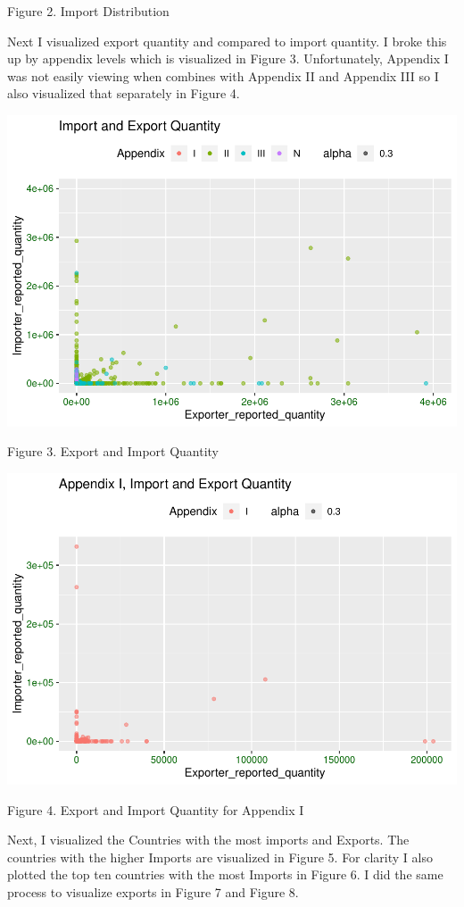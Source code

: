 \documentclass[
  12pt,
]{article}
\begin{document}
Figure 2. Import Distribution

Next I visualized export quantity and compared to import quantity. I
broke this up by appendix levels which is visualized in Figure 3.
Unfortunately, Appendix I was not easily viewing when combines with
Appendix II and Appendix III so I also visualized that separately in
Figure 4.

\includegraphics{Wood_ENV872_Project_files/figure-latex/unnamed-chunk-7-1.pdf}

Figure 3. Export and Import Quantity

\includegraphics{Wood_ENV872_Project_files/figure-latex/unnamed-chunk-8-1.pdf}

Figure 4. Export and Import Quantity for Appendix I

Next, I visualized the Countries with the most imports and Exports. The
countries with the higher Imports are visualized in Figure 5. For
clarity I also plotted the top ten countries with the most Imports in
Figure 6. I did the same process to visualize exports in Figure 7 and
Figure 8.
\end{document}
